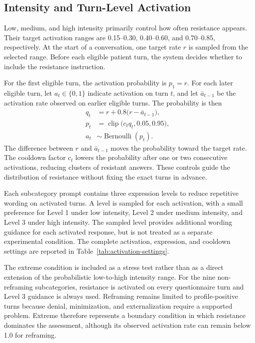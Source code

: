 \subsection{Intensity and Turn-Level Activation}

Low, medium, and high intensity primarily control how often resistance appears. Their target activation ranges are 0.15--0.30, 0.40--0.60, and 0.70--0.85, respectively. At the start of a conversation, one target rate $r$ is sampled from the selected range. Before each eligible patient turn, the system decides whether to include the resistance instruction.

For the first eligible turn, the activation probability is $p_1=r$. For each later eligible turn, let $a_t \in \{0,1\}$ indicate activation on turn $t$, and let $\bar{a}_{t-1}$ be the activation rate observed on earlier eligible turns. The probability is then
\[
\begin{aligned}
q_t &= r + 0.8\bigl(r-\bar{a}_{t-1}\bigr), \\
p_t &= \operatorname{clip}\bigl(c_t q_t, 0.05, 0.95\bigr), \\
a_t &\sim \operatorname{Bernoulli}(p_t).
\end{aligned}
\]
The difference between $r$ and $\bar{a}_{t-1}$ moves the probability toward the target rate. The cooldown factor $c_t$ lowers the probability after one or two consecutive activations, reducing clusters of resistant answers. These controls guide the distribution of resistance without fixing the exact turns in advance.

Each subcategory prompt contains three expression levels to reduce repetitive wording on activated turns. A level is sampled for each activation, with a small preference for Level 1 under low intensity, Level 2 under medium intensity, and Level 3 under high intensity. The sampled level provides additional wording guidance for each activated response, but is not treated as a separate experimental condition. The complete activation, expression, and cooldown settings are reported in Table~\ref{tab:activation-settings}.

The extreme condition is included as a stress test rather than as a direct extension of the probabilistic low-to-high intensity range. For the nine non-reframing subcategories, resistance is activated on every questionnaire turn and Level 3 guidance is always used. Reframing remains limited to profile-positive turns because denial, minimization, and externalization require a supported problem. Extreme therefore represents a boundary condition in which resistance dominates the assessment, although its observed activation rate can remain below 1.0 for reframing.

